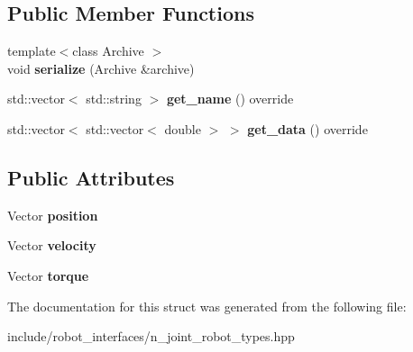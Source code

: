 \subsection*{Public Member Functions}
\begin{DoxyCompactItemize}
\item 
{\footnotesize template$<$class Archive $>$ }\\void {\bfseries serialize} (Archive \&archive)\hypertarget{structrobot__interfaces_1_1NJointRobotTypes_1_1Observation_a9a94b6938b2dc8c71468d11a721330db}{}\label{structrobot__interfaces_1_1NJointRobotTypes_1_1Observation_a9a94b6938b2dc8c71468d11a721330db}

\item 
std\+::vector$<$ std\+::string $>$ {\bfseries get\+\_\+name} () override\hypertarget{structrobot__interfaces_1_1NJointRobotTypes_1_1Observation_a9eda538dfcaf22f36a879e0b6b11e856}{}\label{structrobot__interfaces_1_1NJointRobotTypes_1_1Observation_a9eda538dfcaf22f36a879e0b6b11e856}

\item 
std\+::vector$<$ std\+::vector$<$ double $>$ $>$ {\bfseries get\+\_\+data} () override\hypertarget{structrobot__interfaces_1_1NJointRobotTypes_1_1Observation_a874a72549cdd211ee60390e7df46a4bc}{}\label{structrobot__interfaces_1_1NJointRobotTypes_1_1Observation_a874a72549cdd211ee60390e7df46a4bc}

\end{DoxyCompactItemize}
\subsection*{Public Attributes}
\begin{DoxyCompactItemize}
\item 
Vector {\bfseries position}\hypertarget{structrobot__interfaces_1_1NJointRobotTypes_1_1Observation_a69885da4fb153f7157e1573d6347a3d5}{}\label{structrobot__interfaces_1_1NJointRobotTypes_1_1Observation_a69885da4fb153f7157e1573d6347a3d5}

\item 
Vector {\bfseries velocity}\hypertarget{structrobot__interfaces_1_1NJointRobotTypes_1_1Observation_a177d11f7a5f097b8a2d6959619812890}{}\label{structrobot__interfaces_1_1NJointRobotTypes_1_1Observation_a177d11f7a5f097b8a2d6959619812890}

\item 
Vector {\bfseries torque}\hypertarget{structrobot__interfaces_1_1NJointRobotTypes_1_1Observation_a01a13c04af01d13e0eedde954d9eb84d}{}\label{structrobot__interfaces_1_1NJointRobotTypes_1_1Observation_a01a13c04af01d13e0eedde954d9eb84d}

\end{DoxyCompactItemize}


The documentation for this struct was generated from the following file\+:\begin{DoxyCompactItemize}
\item 
include/robot\+\_\+interfaces/n\+\_\+joint\+\_\+robot\+\_\+types.\+hpp\end{DoxyCompactItemize}
